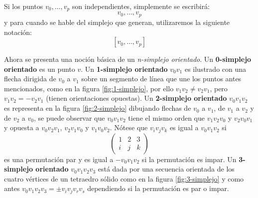 \documentclass[12pt]{book}
\theoremstyle{definition}
\newcounter{in}
\begin{document}
Si los puntos $v_{0}, \ldots, v_{p}$ son independientes, simplemente
se escribirá:
\begin{equation}
  \label{eq:86} v_{0}, \ldots, v_{p}
\end{equation}
y para cuando se hable del simplejo que generan, utilizaremos la
siguiente notación:
\begin{equation}
\label{eq:86_1}
  \left [  v_{0}, \ldots, v_{p} \right ]
\end{equation}

Ahora se presenta una noción básica de un \textit{n-simplejo
  orientado}. Un \textbf{0-simplejo orientado} es un punto $v$. Un
\textbf{1-simplejo orientado} $v_0v_{1}$ es ilustrado con una flecha
dirigida de $v_0$ a $v_{1}$ sobre un segmento de línea que une los
puntos antes mencionados, como en la figura \ref{fig:1-simplejo}, por ello
$v_{1}v_{2} \neq v_{2}v_{1}$, pero $v_{1}v_{2} = -v_{2}v_{1}$ (tienen
orientaciones opuestas). Un \textbf{2-simplejo orientado}
$v_{0}v_{1}v_{2}$ es representa en la figura \ref{fig:2-simplejo}
dibujando flechas de $v_{0}$ a $v_{1}$, de $v_{1}$ a $v_{2}$ y de $v_{2}$ a $v_{0}$, se
puede observar que $v_{0}v_{1}v_{2}$ tiene el mismo orden que
$v_{1}v_{2}v_{0}$ y $v_{2}v_{0}v_{1}$ y opuesta a $v_{0}v_{2}v_{1}$,
$v_{2}v_{1}v_{0}$ y $v_{1}v_{0}v_{2}$.
Nótese que $v_{i}v_{j}v_{k}$ es igual a $v_{0}v_{1}v_{2}$ si
\begin{equation}
  \label{eq:88}
  \begin{pmatrix}
    1 & 2 & 3 \\
    i & j & k
  \end{pmatrix} 
\end{equation}
es una permutación par y es igual a $-v_{0}v_{1}v_{2}$ si la
permutación es impar. Un \textbf{3-simplejo orientado}
$v_{0}v_{1}v_{2}v_{3}$ está dada por una secuencia orientada de los
cuatro vértices de un tetraedro sólido como en la figura
\ref{fig:3-simplejo} y como antes
$v_{0}v_{1}v_{2}v_{3} = \pm v_{i}v_{j}v_{r}v_{s}$ dependiendo si la
permutación es par o impar.
\end{document}
